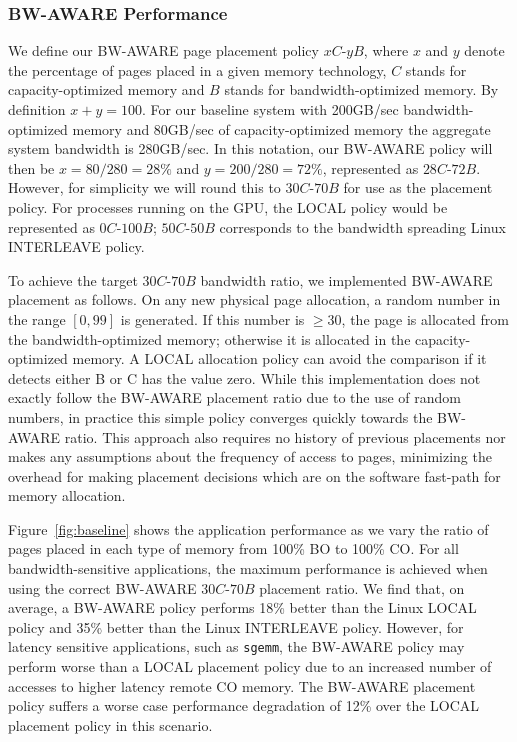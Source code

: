 \subsubsection{BW-AWARE Performance}
We define our BW-AWARE page placement policy $xC$-$yB$, where $x$ and $y$ denote the
percentage of pages placed in a given memory technology, $C$ stands for capacity-optimized
memory and $B$ stands for bandwidth-optimized memory. By definition $x+y=100$. For our baseline
system with 200GB/sec bandwidth-optimized memory and 80GB/sec of capacity-optimized memory the
aggregate system bandwidth is 280GB/sec.  In this
notation, our BW-AWARE policy will then be $x=80/280=28\%$ and $y=200/280=72\%$, represented as
$28C$-$72B$. However, for simplicity we will round this to $30C$-$70B$ for use as the 
placement policy.  For processes running on the GPU, the LOCAL policy
would be represented as $0C$-$100B$; $50C$-$50B$ corresponds to the bandwidth spreading Linux
INTERLEAVE policy.

To achieve the target $30C$-$70B$ bandwidth ratio, we implemented BW-AWARE placement as follows.
On any new physical page allocation, a random number in the range $[0,99]$
is generated.  If this number is $\geq30$, the page is allocated from the bandwidth-optimized memory; 
otherwise it is allocated in the capacity-optimized memory. A LOCAL allocation policy can avoid the
comparison if it detects either B or C has the value zero.  While this implementation does
not exactly follow the BW-AWARE placement ratio due to the use of random numbers, in practice this 
simple policy converges quickly towards the BW-AWARE ratio.  This approach also requires no history
of previous placements {\color{black} nor makes any assumptions about the frequency of access to pages}, 
minimizing the overhead for making placement decisions which are on the 
software fast-path for memory allocation.

Figure~\ref{fig:baseline} shows the application performance as we vary the ratio of pages placed in 
each type of memory from 100\% BO to 100\% CO\@. 
For all bandwidth-sensitive applications, the maximum performance is
achieved when using the correct BW-AWARE $30C$-$70B$ placement ratio.  We
find that, on average, a BW-AWARE policy performs 18\% better than the Linux
LOCAL policy and 35\% better than the Linux INTERLEAVE policy. However, for latency sensitive
applications, such as {\tt sgemm}, the BW-AWARE policy may perform worse than a LOCAL
placement policy due to an increased number of accesses to higher latency remote
CO memory. The BW-AWARE placement policy suffers a worse case performance degradation of
12\% over the LOCAL placement policy in this scenario.

